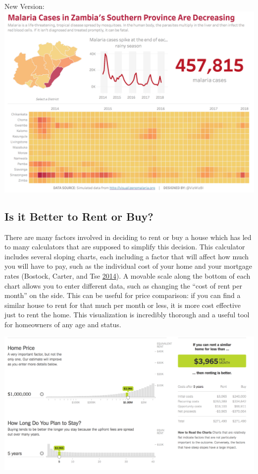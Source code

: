 \documentclass[]{book}
\begin{document}
New Version: \includegraphics{images/malaria_makeover.png}

\hypertarget{is-it-better-to-rent-or-buy}{%
\subsection{Is it Better to Rent or Buy?}\label{is-it-better-to-rent-or-buy}}

There are many factors involved in deciding to rent or buy a house which has led to many calculators that are supposed to simplify this decision. This calculator includes several sloping charts, each including a factor that will affect how much you will have to pay, such as the individual cost of your home and your mortgage rates (Bostock, Carter, and Tse \protect\hyperlink{ref-rent_or_buy}{2014}). A movable scale along the bottom of each chart allows you to enter different data, such as changing the ``cost of rent per month'' on the side. This can be useful for price comparison: if you can find a similar house to rent for that much per month or less, it is more cost effective just to rent the home. This visualization is incredibly thorough and a useful tool for homeowners of any age and status.

\includegraphics{images/rentcalc.png}
\end{document}
